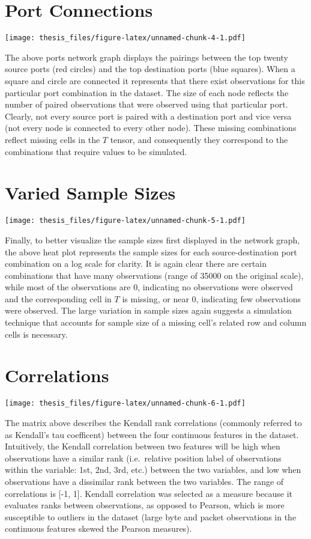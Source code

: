 \documentclass[12pt,twoside]{dukestatscithesis}
\theoremstyle{definition}
\theoremstyle{definition}
\theoremstyle{definition}
\theoremstyle{remark}
\begin{document}
\section{Port Connections}\label{port-connections}

\texttt{[image: thesis\_files/figure-latex/unnamed-chunk-4-1.pdf]}

The above ports network graph displays the pairings between the top
twenty source ports (red circles) and the top destination ports (blue
squares). When a square and circle are connected it represents that
there exist observations for this particular port combination in the
dataset. The size of each node reflects the number of paired
observations that were observed using that particular port. Clearly, not
every source port is paired with a destination port and vice versa (not
every node is connected to every other node). These missing combinations
reflect missing cells in the \(T\) tensor, and consequently they
correspond to the combinations that require values to be simulated.

\section{Varied Sample Sizes}\label{varied-sample-sizes}

\texttt{[image: thesis\_files/figure-latex/unnamed-chunk-5-1.pdf]}

Finally, to better visualize the sample sizes first displayed in the
network graph, the above heat plot represents the sample sizes for each
source-destination port combination on a log scale for clarity. It is
again clear there are certain combinations that have many observations
(range of 35000 on the original scale), while most of the observations
are 0, indicating no observations were observed and the corresponding
cell in \(T\) is missing, or near 0, indicating few observations were
observed. The large variation in sample sizes again suggests a
simulation technique that accounts for sample size of a missing cell's
related row and column cells is necessary.

\section{Correlations}\label{correlations}

\texttt{[image: thesis\_files/figure-latex/unnamed-chunk-6-1.pdf]}

The matrix above describes the Kendall rank correlations (commonly
referred to as Kendall's tau coefficent) between the four continuous
features in the dataset. Intuitively, the Kendall correlation between
two features will be high when observations have a similar rank
(i.e.~relative position label of observations within the variable: 1st,
2nd, 3rd, etc.) between the two variables, and low when observations
have a dissimilar rank between the two variables. The range of
correlations is {[}-1, 1{]}. Kendall correlation was selected as a
measure because it evaluates ranks between observations, as opposed to
Pearson, which is more susceptible to outliers in the dataset (large
byte and packet observations in the continuous features skewed the
Pearson measures).
\end{document}
